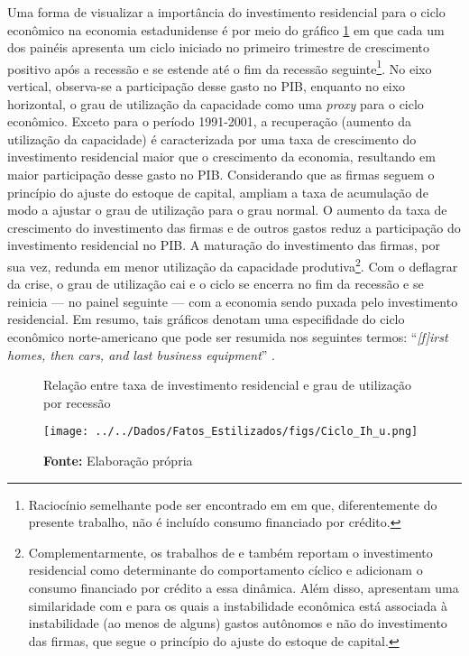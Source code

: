 Uma forma de visualizar a importância do investimento residencial para o ciclo econômico na economia estadunidense é por meio do gráfico \ref{FigIh_u} em que cada um dos painéis apresenta um ciclo iniciado no primeiro trimestre de crescimento positivo após a recessão e se estende até o fim da recessão seguinte\footnote{
	Raciocínio semelhante pode ser encontrado em \textcite{fiebiger_semi-autonomous_2018} em que, diferentemente do presente trabalho, não é incluído consumo financiado por crédito.}. 
No eixo vertical, observa-se a participação desse gasto no PIB, enquanto no eixo horizontal, o grau de utilização da capacidade como uma \textit{proxy} para o ciclo econômico. Exceto para o período 1991-2001, a recuperação (aumento da utilização da capacidade) é caracterizada por uma taxa de crescimento do investimento residencial maior que o crescimento da economia, resultando em maior participação desse gasto no PIB. Considerando que as firmas seguem o princípio do ajuste do estoque de capital, ampliam a taxa de acumulação de modo a ajustar o grau de utilização para o grau normal. O aumento da taxa de crescimento do investimento das firmas e de outros gastos reduz a participação do investimento residencial no PIB. A maturação do investimento das firmas, por sua vez, redunda em menor utilização da capacidade produtiva\footnote{
	Complementarmente, os trabalhos de \textcite{fiebiger_semi-autonomous_2018} e \textcite{fiebiger_trend_2017} também reportam o investimento residencial como determinante do comportamento cíclico e adicionam o consumo financiado por crédito a essa dinâmica. Além disso, apresentam uma similaridade com \textcite{dejuan_hidden_2017} e \textcite{teixeira_crescimento_2015} para os quais a instabilidade econômica está associada à instabilidade (ao menos de alguns) gastos autônomos e não do investimento das firmas, que segue o princípio do ajuste do estoque de capital.}. 
Com o deflagrar da crise, o grau de utilização cai e o ciclo se encerra no fim da recessão e se reinicia --- no painel seguinte --- com a economia sendo puxada pelo investimento residencial.
Em resumo, tais gráficos denotam uma especifidade do ciclo econômico norte-americano que pode ser resumida nos seguintes termos: ``\textit{[f]irst homes, then cars, and last business equipment}'' \cite[p.~8]{leamer_housing_2007}.




\begin{figure}[H]
	\centering
	\caption{Relação entre taxa de investimento residencial e grau de utilização por recessão}
	\label{FigIh_u}
	\texttt{[image: ../../Dados/Fatos\_Estilizados/figs/Ciclo\_Ih\_u.png]}
	\caption*{\textbf{Fonte:} Elaboração própria}
\end{figure}

